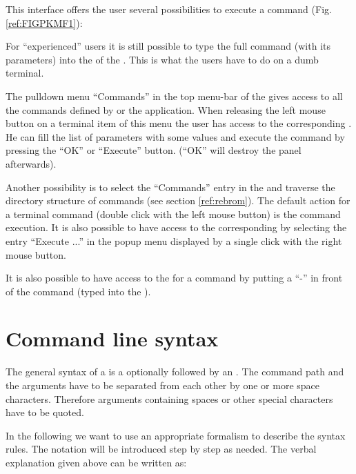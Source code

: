 This interface offers the user several possibilities to execute a
command (Fig. \ref{ref:FIGPKMF1}):
\begin{UL}
\item
For ``experienced'' users it is still possible to type the full command 
(with its parameters) into the \INP{} of the \EW{} .
This is what the users have to do on a dumb terminal.
\item
The pulldown menu ``Commands''  in the top menu-bar of the \MB{}
gives access to all the commands defined by \KUIP{} or the application.
When releasing the left mouse button on a terminal item of this menu
the user has access to the corresponding \CAP{}. He
can fill the list of parameters with some values and execute the command
by pressing the ``OK'' or ``Execute'' button. (``OK'' will destroy the panel
afterwards).
\item
Another possibility is to select the ``Commands'' entry in the \MB{} 
and traverse the directory structure of commands (see section 
\ref{ref:rebrom}).
The default action for a terminal command (double click with the left mouse 
button) is the command execution. It is also possible to have access to the 
corresponding \CAP{} by selecting the entry ``Execute ...''
in the popup menu displayed by a single click with the right mouse button.
\item
It is also possible to have access to the \CAP{} for
a command by putting a ``-'' in front of the command (typed into the
\INP{}).
\end{UL}



\fi%

%
\section{Command line syntax}

The general syntax of a  is a 
optionally followed by an .
The command path and the arguments have to be separated from each other by one
or more space characters.
Therefore arguments containing spaces or other special characters have
to be quoted.

In the following we want to use an appropriate formalism to describe the
syntax rules.
The notation will be introduced step by step as needed.
The verbal explanation given above can be written as:

